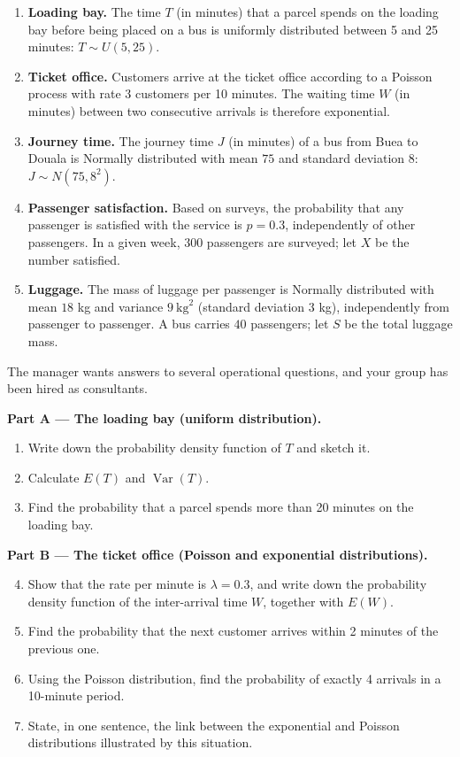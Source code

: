 \documentclass[11pt]{article}
\newcounter{popsec}
\newcounter{popsub}
\newcommand{\courssub}[1]{%
  \stepcounter{popsub}%
  \par\vspace{9pt}\noindent{\popxbold\fontsize{11.5}{13}\selectfont\color{popink}{\color{poporange}\thepopsec.\thepopsub}\hspace{6pt}#1}\par\nopagebreak\vspace{4pt}
}
\begin{document}
\begin{enumerate}
\item \textbf{Loading bay.} The time $T$ (in minutes) that a parcel spends on the loading bay before being placed on a bus is uniformly distributed between 5 and 25 minutes: $T \sim U(5, 25)$.
\item \textbf{Ticket office.} Customers arrive at the ticket office according to a Poisson process with rate $3$ customers per 10 minutes. The waiting time $W$ (in minutes) between two consecutive arrivals is therefore exponential.
\item \textbf{Journey time.} The journey time $J$ (in minutes) of a bus from Buea to Douala is Normally distributed with mean $75$ and standard deviation $8$: $J \sim N(75, 8^2)$.
\item \textbf{Passenger satisfaction.} Based on surveys, the probability that any passenger is satisfied with the service is $p = 0.3$, independently of other passengers. In a given week, $300$ passengers are surveyed; let $X$ be the number satisfied.
\item \textbf{Luggage.} The mass of luggage per passenger is Normally distributed with mean $18$ kg and variance $9\ \mathrm{kg}^2$ (standard deviation $3$ kg), independently from passenger to passenger. A bus carries $40$ passengers; let $S$ be the total luggage mass.
\end{enumerate}

The manager wants answers to several operational questions, and your group has been hired as consultants.

\courssub{Tasks}

\textbf{Part A — The loading bay (uniform distribution).}
\begin{enumerate}
\item Write down the probability density function of $T$ and sketch it.
\item Calculate $E(T)$ and $\operatorname{Var}(T)$.
\item Find the probability that a parcel spends more than 20 minutes on the loading bay.
\end{enumerate}

\textbf{Part B — The ticket office (Poisson and exponential distributions).}
\begin{enumerate}
\setcounter{enumi}{3}
\item Show that the rate per minute is $\lambda = 0.3$, and write down the probability density function of the inter-arrival time $W$, together with $E(W)$.
\item Find the probability that the next customer arrives within 2 minutes of the previous one.
\item Using the Poisson distribution, find the probability of exactly 4 arrivals in a 10-minute period.
\item State, in one sentence, the link between the exponential and Poisson distributions illustrated by this situation.
\end{enumerate}
\end{document}
